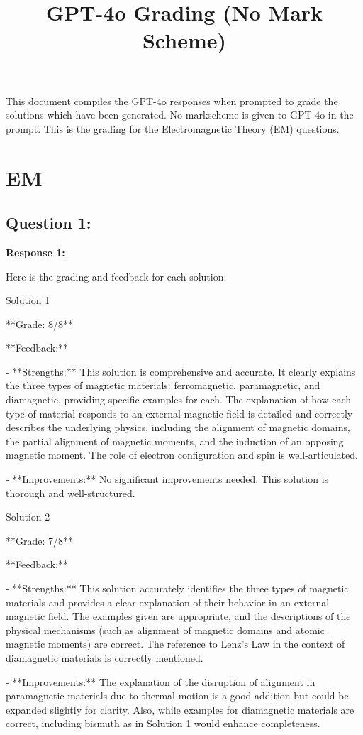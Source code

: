 \documentclass[a4paper,11pt]{article}
\title{GPT-4o Grading (No Mark Scheme)}
\begin{document}
\maketitle
This document compiles the GPT-4o responses when prompted to grade the solutions which have been generated. No markscheme is given to GPT-4o in the prompt. This is the grading for the Electromagnetic Theory (EM) questions. 

\section{EM}
\subsection*{Question 1:}

\textbf{Response 1:}

Here is the grading and feedback for each solution:

Solution 1

**Grade: 8/8**

**Feedback:**

- **Strengths:** This solution is comprehensive and accurate. It clearly explains the three types of magnetic materials: ferromagnetic, paramagnetic, and diamagnetic, providing specific examples for each. The explanation of how each type of material responds to an external magnetic field is detailed and correctly describes the underlying physics, including the alignment of magnetic domains, the partial alignment of magnetic moments, and the induction of an opposing magnetic moment. The role of electron configuration and spin is well-articulated.

- **Improvements:** No significant improvements needed. This solution is thorough and well-structured.

Solution 2

**Grade: 7/8**

**Feedback:**

- **Strengths:** This solution accurately identifies the three types of magnetic materials and provides a clear explanation of their behavior in an external magnetic field. The examples given are appropriate, and the descriptions of the physical mechanisms (such as alignment of magnetic domains and atomic magnetic moments) are correct. The reference to Lenz's Law in the context of diamagnetic materials is correctly mentioned.

- **Improvements:** The explanation of the disruption of alignment in paramagnetic materials due to thermal motion is a good addition but could be expanded slightly for clarity. Also, while examples for diamagnetic materials are correct, including bismuth as in Solution 1 would enhance completeness.
\end{document}

